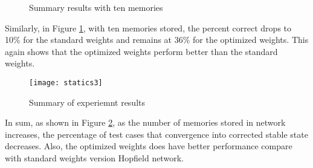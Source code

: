 \begin{figure}[h]
	\centering
	\caption{Summary results with ten memories}
	\label{fg:ost5}
\end{figure}

Similarly, in Figure \ref{fg:ost5}, with ten memories stored, the percent correct drops to 10\% for the standard weights and remains at 36\% for the optimized weights. This again shows that the optimized weights perform better than the standard weights.

\begin{figure}[h]
\centering
\texttt{[image: statics3]}
\caption{Summary of experiemnt results}
\label{fg:sum}
\end{figure}

In sum, as shown in Figure \ref{fg:sum}, as the number of memories stored in network increases, the percentage of test cases that convergence into corrected stable state decreases. Also, the optimized weights does have better performance compare with standard weights version Hopfield network. 


